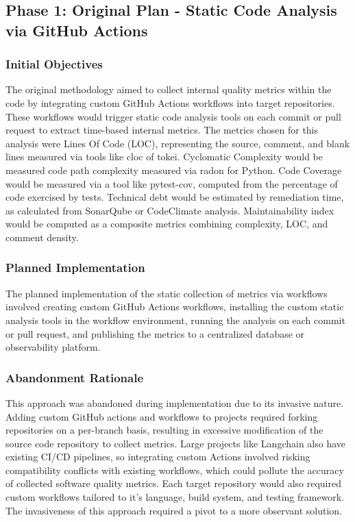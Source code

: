 \documentclass[12pt]{article}
\begin{document}
\subsection{Phase 1: Original Plan - Static Code Analysis via GitHub Actions}

\subsubsection{Initial Objectives}
The original methodology aimed to collect internal quality metrics within
the code by integrating custom GitHub Actions workflows into target
repositories. These workflows
would trigger static code analysis tools on each commit or pull
request to extract time-based
internal metrics. The metrics chosen for this analysis were Lines Of
Code (LOC), representing the source, comment, and blank lines
measured via tools like cloc of tokei. Cyclomatic Complexity would be
measured code path complexity measured via radon for Python.
Code Coverage would be measured via a tool like pytest-cov, computed
from the percentage of code exercised by tests.
Technical debt would be estimated by remediation time, as calculated
from SonarQube or CodeClimate analysis.
Maintainability index would be computed as a composite metrics
combining complexity, LOC, and comment density.

\subsubsection{Planned Implementation}
The planned implementation of the static collection of metrics via
workflows involved creating custom GitHub Actions workflows,
installing the custom static analysis tools in the workflow
environment, running the analysis on each commit or pull request,
and publishing the metrics to a centralized database or observability platform.

\subsubsection{Abandonment Rationale}
This approach was abandoned during implementation due to its
invasive nature. Adding custom GitHub
actions and workflows to projects required forking repositories on a
per-branch basis, resulting
in excessive modification of the source code repository to collect
metrics. Large projects like
Langchain also have existing CI/CD pipelines, so integrating custom
Actions involved risking
compatibility conflicts with existing workflows, which could pollute
the accuracy of collected software
quality metrics. Each target repository would also required custom
workflows tailored to it's language,
build system, and testing framework. The invasiveness of this
approach required a pivot to a more
observant solution.
\end{document}
